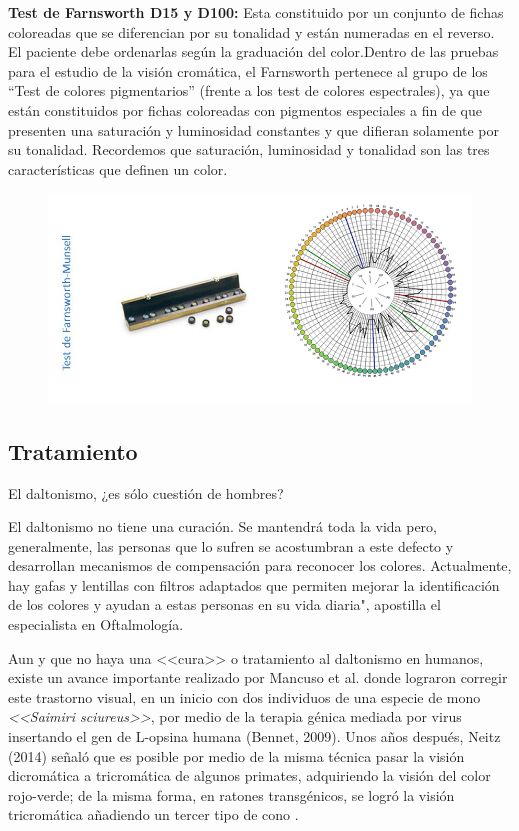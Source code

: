 \documentclass[10pt]{article}
\begin{document}
\textbf{Test de Farnsworth D15 y D100:} Esta constituido por un conjunto de fichas coloreadas que se diferencian por su tonalidad y están numeradas en el reverso. El paciente debe ordenarlas según la graduación del color.Dentro de las pruebas para el estudio de la visión cromática, el Farnsworth pertenece al grupo de los “Test de colores pigmentarios” (frente a los test de colores espectrales), ya que están constituidos por fichas coloreadas con pigmentos especiales a fin de que presenten una saturación y luminosidad constantes y que difieran solamente por su tonalidad. Recordemos que
saturación, luminosidad y tonalidad son las tres características que definen un color\cite{IEEEreferencias:Ref31}.

\begin{figure}[H]
	\begin{center}
\includegraphics[scale = 0.55]{Imagenes/fm.png}
	\end{center} 
\end{figure}

\subsection{Tratamiento}
El daltonismo, ¿es sólo cuestión de hombres?

El daltonismo no tiene una curación. Se mantendrá toda la vida pero, generalmente, las personas que lo sufren se acostumbran a este defecto y desarrollan mecanismos de compensación para reconocer los colores. Actualmente, hay gafas y lentillas con filtros adaptados que permiten mejorar la identificación de los colores y ayudan a estas personas en su vida diaria", apostilla el especialista en Oftalmología\cite{IEEEreferencias:Ref26}.

Aun y que no haya una <<cura>> o tratamiento al daltonismo en humanos, existe un avance importante realizado por Mancuso et al. donde lograron corregir este trastorno visual, en un inicio con dos individuos de una especie de mono \textit{<<Saimiri sciureus>>}, por medio de la terapia génica mediada por virus insertando el gen de L-opsina humana (Bennet, 2009). Unos años después, Neitz (2014) señaló que es posible por medio de la misma técnica pasar la visión dicromática a tricromática de algunos primates, adquiriendo la visión del color rojo-verde; de la misma forma, en ratones transgénicos, se logró la visión tricromática añadiendo un tercer tipo de cono \cite{IEEEreferencias:Ref26}.
\end{document}
